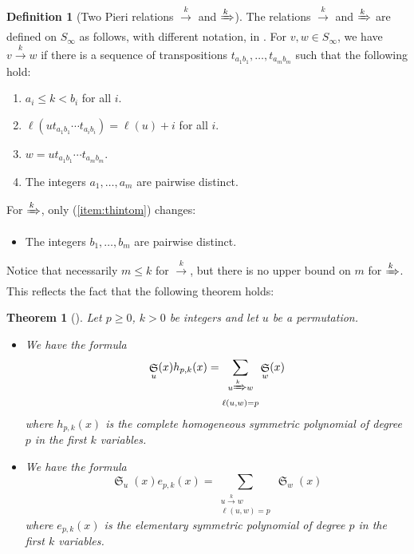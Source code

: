 \documentclass{amsart}
\newtheorem{theorem}{Theorem}[section]
\theoremstyle{definition}
\newtheorem{definition}[lemma]{Definition}
\theoremstyle{remark}
\numberwithin{equation}{subsection}
\DeclareMathOperator{\sch}{\mathfrak{S}}
\newcommand{\tom}[1]{\xrightarrow{#1}}
\newcommand{\Tom}[1]{\xRightarrow{#1}}
\begin{document}
\begin{definition}[Two Pieri relations $\tom{k}$ and $\Tom{k}$]
The relations $\tom{k}$ and $\Tom{k}$ are defined on $S_\infty$ as follows, with different notation, in \cite{sottile}. For $v,w\in S_\infty$, we have $v\tom{k} w$ if there is a sequence of transpositions $t_{a_1b_1},\ldots,t_{a_mb_m}$ such that the following hold:
\begin{enumerate}
\item  $a_i \leq k < b_i$ for all $i$.
\item $\ell(ut_{a_1b_1}\cdots t_{a_i b_i}) = \ell(u)+i$ for all $i$.
\item $w = ut_{a_1b_1}\cdots t_{a_m b_m}$.
\item \label{item:thintom} The integers $a_1,\ldots,a_m$ are pairwise distinct.
\end{enumerate}
For $\Tom{k}$, only (\ref{item:thintom}) changes:
\begin{itemize}
  \item[(\ref*{item:thintom}')] \label{item:varthintom} The integers $b_1,\ldots,b_m$ are pairwise distinct.
\end{itemize}

Notice that necessarily $m\leq k$ for $\tom{k}$, but there is no upper bound on $m$ for $\Tom{k}$. This reflects the fact that the following theorem holds:
\begin{theorem}[{\cite[Theorem~1]{sottile}}]
  Let $p\geq 0$, $k>0$ be integers and let $u$ be a permutation.
  \begin{itemize}
    
    \item[\textrm{I}. ] We have the formula
    $$\sch_u(x)h_{p,k}(x) = \sum_{\substack{u\Tom{k} w \\ \ell(u,w) = p}} \sch_w(x)$$
    where $h_{p,k}(x)$ is the complete homogeneous symmetric polynomial of degree $p$ in the first $k$ variables.
    \item[\textrm{II}. ] We have the formula
    $$\sch_u(x)e_{p,k}(x) = \sum_{\substack{u\tom{k} w \\ \ell(u,w) = p}} \sch_w(x)$$
    where $e_{p,k}(x)$ is the elementary symmetric polynomial of degree $p$ in the first $k$ variables.
  \end{itemize}
\end{theorem}

\end{definition}
\end{document}
